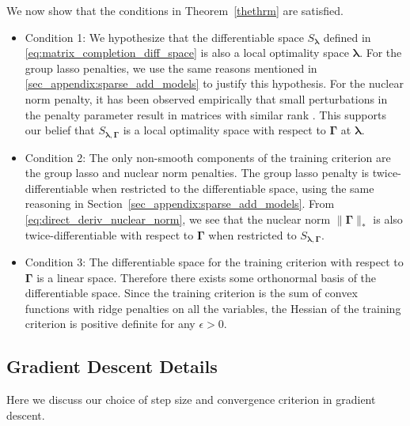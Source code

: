 \documentclass[12pt,letterpaper]{article}
\begin{document}
We now show that the conditions in Theorem~\ref{thethrm} are satisfied.
\begin{itemize}
	\item[] Condition 1: We hypothesize that the differentiable space $S_{\boldsymbol{\lambda}}$ defined in \eqref{eq:matrix_completion_diff_space} is also a local optimality space $\boldsymbol{\lambda}$. For the group lasso penalties, we use the same reasons mentioned in \ref{sec_appendix:sparse_add_models} to justify this hypothesis. For the nuclear norm penalty, it has been observed empirically that small perturbations in the penalty parameter result in matrices with similar rank \citep{mazumder2010spectral}. This supports our belief that $S_{\boldsymbol{\lambda}, \boldsymbol{\Gamma}}$ is a local optimality space with respect to $\boldsymbol{\Gamma}$ at $\boldsymbol{\lambda}$.
	\item[] Condition 2: The only non-smooth components of the training criterion are the group lasso and nuclear norm penalties. The group lasso penalty is twice-differentiable when restricted to the differentiable space, using the same reasoning in Section~\ref{sec_appendix:sparse_add_models}. From \eqref{eq:direct_deriv_nuclear_norm}, we see that the nuclear norm $\|\boldsymbol{\Gamma}\|_{*}$ is also twice-differentiable with respect to $\boldsymbol{\Gamma}$ when restricted to $S_{\boldsymbol{\lambda}, \boldsymbol{\Gamma}}$.
	\hfill {}
	\item[] Condition 3: The differentiable space for the training criterion with respect to $\boldsymbol{\Gamma}$ is a linear space. Therefore there exists some orthonormal basis of the differentiable space. Since the training criterion is the sum of convex functions with ridge penalties on all the variables, the Hessian of the training criterion is positive definite for any $\epsilon > 0$.
	\hfill {}
\end{itemize}

\subsection{Gradient Descent Details}\label{sec:alg_details}
Here we discuss our choice of step size and convergence criterion in gradient descent.
\end{document}
